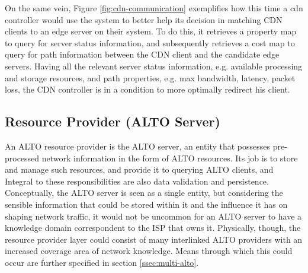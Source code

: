 
    On the same vein, Figure \ref{fig:cdn-communication} exemplifies how this time a cdn controller would use the system to better help its decision in matching CDN clients to an edge server on their system.
    To do this, it retrieves a property map to query for server status information, and subsequently retrieves a cost map to query for path information between the CDN client and the candidate edge servers.
    Having all the relevant server status information, e.g. available processing and storage resources, and path properties, e.g. max bandwidth, latency, packet loss, the CDN controller is in a condition to more optimally redirect his client.


\subsection{Resource Provider (ALTO Server)}

    An ALTO resource provider is the ALTO server, an entity that possesses pre-processed network information in the form of ALTO resources.
    Its job is to store and manage such resources, and provide it to querying ALTO clients, and Integral to these responsibilities are also data validation and persistence.
    Conceptually, the ALTO server is seen as a single entity, but considering the sensible information that could be stored within it and the influence it has on shaping network traffic, it would not be uncommon for an ALTO server to have a knowledge domain correspondent to the ISP that owns it.
    Physically, though, the resource provider layer could consist of many interlinked ALTO providers with an increased coverage area of network knowledge.
    Means through which this could occur are further specified in section \ref{ssec:multi-alto}.

